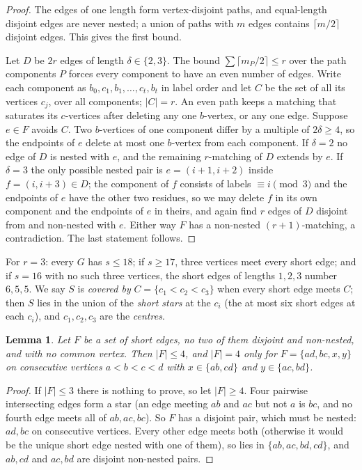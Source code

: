\documentclass[11pt]{amsart}
\newtheorem{lemma}[theorem]{Lemma}
\theoremstyle{definition}\newtheorem{problem}{Problem}
\theoremstyle{remark}\newtheorem*{remark}{Remark}
\begin{document}
\begin{proof}
The edges of one length form vertex-disjoint paths, and equal-length disjoint edges are never nested; a union of
paths with $m$ edges contains $\lceil m/2\rceil$ disjoint edges. This gives the first bound.

Let $D$ be $2r$ edges of length $\delta\in\{2,3\}$. The bound $\sum\lceil m_P/2\rceil\le r$ over the path components
$P$ forces every component to have an even number of edges. Write each component as $b_0,c_1,b_1,\dots,c_t,b_t$ in
label order and let $C$ be the set of all its vertices $c_j$, over all components; $|C|=r$. An even path keeps a
matching that saturates its $c$-vertices after deleting any one $b$-vertex, or any one edge. Suppose $e\in F$ avoids
$C$. Two $b$-vertices of one component differ by a multiple of $2\delta\ge4$, so the endpoints of $e$ delete at most
one $b$-vertex from each component. If $\delta=2$ no edge of $D$ is nested with $e$, and the remaining $r$-matching of
$D$ extends by $e$. If $\delta=3$ the only possible nested pair is $e=(i+1,i+2)$ inside $f=(i,i+3)\in D$; the
component of $f$ consists of labels $\equiv i\pmod3$ and the endpoints of $e$ have the other two residues, so we may
delete $f$ in its own component and the endpoints of $e$ in theirs, and again find $r$ edges of $D$ disjoint from and
non-nested with $e$. Either way $F$ has a non-nested $(r+1)$-matching, a contradiction. The last statement follows.
\end{proof}

For $r=3$: every $G$ has $s\le18$; if $s\ge17$, three vertices meet every short edge; and if $s=16$ with no such
three vertices, the short edges of lengths $1,2,3$ number $6,5,5$. We say $S$ is \emph{covered by} $C=\{c_1<c_2<c_3\}$
when every short edge meets $C$; then $S$ lies in the union of the \emph{short stars} at the $c_i$ (the at most six
short edges at each $c_i$), and $c_1,c_2,c_3$ are the \emph{centres}.

\begin{lemma}\label{lem:pair}
Let $F$ be a set of short edges, no two of them disjoint and non-nested, and with no common vertex. Then $|F|\le4$,
and $|F|=4$ only for $F=\{ad,bc,x,y\}$ on consecutive vertices $a<b<c<d$ with $x\in\{ab,cd\}$ and $y\in\{ac,bd\}$.
\end{lemma}

\begin{proof}
If $|F|\le3$ there is nothing to prove, so let $|F|\ge4$. Four pairwise intersecting edges form a star (an edge
meeting $ab$ and $ac$ but not $a$ is $bc$, and no fourth edge meets all of $ab,ac,bc$). So $F$ has a disjoint pair, which must be nested: $ad,bc$ on consecutive vertices. Every
other edge meets both (otherwise it would be the unique short edge nested with one of them), so lies in
$\{ab,ac,bd,cd\}$, and $ab,cd$ and $ac,bd$ are disjoint non-nested pairs.
\end{proof}
\end{document}
